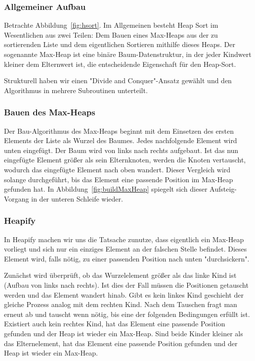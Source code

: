 \documentclass[11pt]{article}
\begin{document}
    \subsubsection{Allgemeiner Aufbau}
    Betrachte Abbildung~\ref{fig:hsort}.
    Im Allgemeinen besteht Heap Sort im Wesentlichen aus zwei Teilen:
    Dem Bauen eines Max-Heaps aus der zu sortierenden Liste und dem
    eigentlichen Sortieren mithilfe dieses Heaps.
    Der sogenannte Max-Heap ist eine binäre Baum-Datenstruktur, in der jeder
    Kindwert kleiner dem Elternwert ist, die entscheidende Eigenschaft für
    den Heap-Sort.

    Strukturell haben wir einen "Divide and Conquer"-Ansatz gewählt und den
    Algorithmus in mehrere Subroutinen unterteilt.

    \subsubsection{Bauen des Max-Heaps}
    Der Bau-Algorithmus des Max-Heaps beginnt mit dem Einsetzen des ersten
    Elements der Liste als Wurzel des Baumes.
    Jedes nachfolgende Element wird unten eingefügt. Der Baum wird von links
    nach rechts aufgebaut.
    Ist das nun eingefügte Element größer als sein Elternknoten, werden die
    Knoten vertauscht, wodurch das eingefügte Element nach oben wandert.
    Dieser Vergleich wird solange durchgeführt, bis das Element eine passende
    Position im Max-Heap gefunden hat.
    In Abbildung~\ref{fig:buildMaxHeap} spiegelt sich dieser Aufsteig-Vorgang
    in der unteren Schleife wieder.

    \subsubsection{Heapify}
    In Heapify machen wir uns die Tatsache zunutze, dass eigentlich ein
    Max-Heap vorliegt und sich nur ein einziges Element an der falschen
    Stelle befindet.
    Dieses Element wird, falls nötig, zu einer passenden Position nach unten
    "durchsickern".

    Zunächst wird überprüft, ob das Wurzelelement größer als das linke Kind
    ist (Aufbau von links nach rechts).
    Ist dies der Fall müssen die Positionen getauscht werden und das Element
    wandert hinab.
    Gibt es kein linkes Kind geschieht der gleiche Prozess analog mit dem
    rechten Kind.
    Nach dem Tauschen fragt man erneut ab und tauscht wenn nötig, bis eine
    der folgenden Bedingungen erfüllt ist.
    Existiert auch kein rechtes Kind, hat das Element eine passende Position
    gefunden und der Heap ist wieder ein Max-Heap.
    Sind beide Kinder kleiner als das Elternelement, hat das Element eine
    passende Position gefunden und der Heap ist wieder ein Max-Heap.
\end{document}
